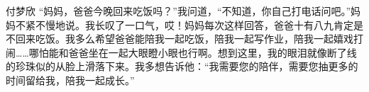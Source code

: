 {}\markdownRendererInterblockSeparator
{}付梦欣\markdownRendererInterblockSeparator
{}“妈妈，爸爸今晚回来吃饭吗？”我问道，“不知道，你自己打电话问吧。”妈妈不紧不慢地说。我长叹了一口气，哎！妈妈每次这样回答，爸爸十有八九肯定是不回来吃饭。我多么希望爸爸能陪我一起吃饭，陪我一起写作业，陪我一起嬉戏打闹……哪怕能和爸爸坐在一起大眼瞪小眼也行啊。想到这里，我的眼泪就像断了线的珍珠似的从脸上滑落下来。我多想告诉他：“我需要您的陪伴，需要您抽更多的时间留给我，陪我一起成长。”\markdownRendererDocumentEnd